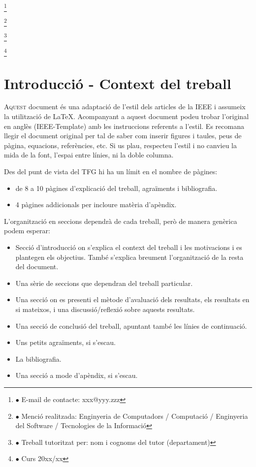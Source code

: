 ﻿\documentclass[10pt,a4paper,twocolumn,twoside]{article}
\newcommand\blfootnote[1]{%
  \begingroup
  \renewcommand\thefootnote{}\footnote{#1}%
  \addtocounter{footnote}{-1}%
  \endgroup
}
\begin{document}
\blfootnote{$\bullet$ E-mail de contacte: xxx@yyy.zzz}
\blfootnote{$\bullet$ Menció realitzada: Enginyeria de Computadors / Computació / Enginyeria del Software / Tecnologies de la Informació}
\blfootnote{$\bullet$ Treball tutoritzat per: nom i cognoms del tutor (departament)}
\blfootnote{$\bullet$ Curs 20xx/xx}

\section{Introducció - Context del treball}

\lettrine[lines=3]{A}{quest} document és una adaptació  de l'estil dels articles de la IEEE i assumeix la utilització de LaTeX. Acompanyant a aquest document podeu trobar l'original en anglès (IEEE-Template) amb les instruccions referents a l'estil. Es recomana llegir el document original per tal de saber com inserir figures i taules, peus de pàgina, equacions, referències, etc. Si us plau, respecteu l'estil i no canvieu la mida de la font, l'espai entre línies, ni la doble columna.

Des del punt de vista del TFG hi ha un límit en el nombre de pàgines: 

\begin{itemize}
\item de 8 a 10 pàgines d’explicació del treball, agraïments i bibliografia.
\item 4 pàgines addicionals per incloure matèria d’apèndix.
\end{itemize}

L'organització en seccions dependrà de cada treball, però de manera genèrica podem esperar:

\begin{itemize}
\item Secció d’introducció on s’explica el context del treball i les motivacions i es plantegen els objectius. També s’explica breument l’organització de la resta del document.
\item Una sèrie de seccions que dependran del treball particular.
\item Una secció on es presenti el mètode d’avaluació dels resultats, els resultats en si mateixos, i una discussió/reflexió sobre aquests resultats.
\item Una secció de conclusió del treball, apuntant també les línies de continuació.
\item Uns petits agraïments, si s’escau.
\item La bibliografia.
\item Una secció a mode d’apèndix, si s’escau.
\end{itemize}
\end{document}
